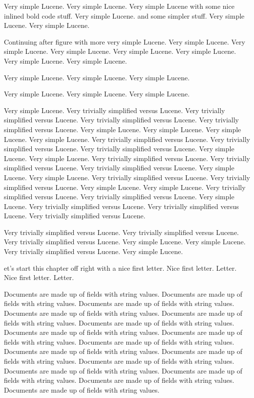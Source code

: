 \documentclass[11pt]{book}
\begin{document}
Very simple Lucene.
Very simple Lucene.
Very simple Lucene with some nice inlined
bold code
 stuff.
Very simple Lucene.
and some simpler  stuff.
Very simple Lucene.
Very simple Lucene.

%

\noindent
Continuing after figure with more very simple Lucene.
Very simple Lucene.
Very simple Lucene.
Very simple Lucene.
Very simple Lucene.
Very simple Lucene.
Very simple Lucene.
Very simple Lucene.

Very simple Lucene.
Very simple Lucene.
Very simple Lucene.

%

Very simple Lucene.
Very simple Lucene.
Very simple Lucene.

Very simple Lucene.
Very trivially simplified versus  Lucene.
Very trivially simplified versus  Lucene.
Very trivially simplified versus  Lucene.
Very trivially simplified versus  Lucene.
Very simple Lucene.
Very simple Lucene.
Very simple Lucene.
Very simple Lucene.
Very trivially simplified versus  Lucene.
Very trivially simplified versus  Lucene.
Very trivially simplified versus  Lucene.
Very simple Lucene.
Very simple Lucene.
Very trivially simplified versus  Lucene.
Very trivially simplified versus  Lucene.
Very trivially simplified versus  Lucene.
Very simple Lucene.
Very simple Lucene.
Very trivially simplified versus  Lucene.
Very trivially simplified versus  Lucene.
Very simple Lucene.
Very simple Lucene.
Very trivially simplified versus  Lucene.
Very trivially simplified versus  Lucene.
Very simple Lucene.
Very trivially simplified versus  Lucene.
Very trivially simplified versus  Lucene.
Very trivially simplified versus  Lucene.

%

Very trivially simplified versus  Lucene.
Very trivially simplified versus  Lucene.
Very trivially simplified versus  Lucene.
Very simple Lucene.
Very simple Lucene.
Very trivially simplified versus  Lucene.
Very simple Lucene.


et's start this chapter off right with a nice
first letter.  Nice first letter. Letter.
Nice first letter. Letter.


\noindent
Documents are made up of fields with string values.
Documents are made up of fields with string values.
Documents are made up of fields with string values.
Documents are made up of fields with string values.
Documents are made up of fields with string values.
Documents are made up of fields with string values.
Documents are made up of fields with string values.
Documents are made up of fields with string values.
Documents are made up of fields with string values.
Documents are made up of fields with string values.
Documents are made up of fields with string values.
Documents are made up of fields with string values.
Documents are made up of fields with string values.
Documents are made up of fields with string values.
Documents are made up of fields with string values.
Documents are made up of fields with string values.
\end{document}
